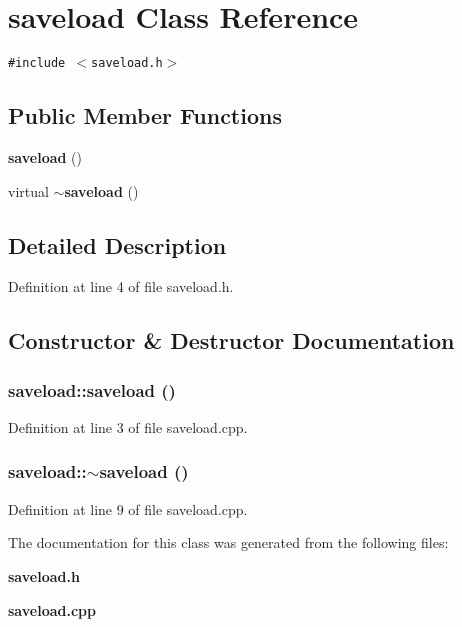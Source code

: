 \section{saveload Class Reference}
\label{classsaveload}
{\tt \#include $<$saveload.h$>$}

\subsection*{Public Member Functions}
\begin{CompactItemize}
\item 
{\bf saveload} ()
\item 
virtual {\bf $\sim$saveload} ()
\end{CompactItemize}


\subsection{Detailed Description}




Definition at line 4 of file saveload.h.

\subsection{Constructor \& Destructor Documentation}
\subsubsection{\setlength{\rightskip}{0pt plus 5cm}saveload::saveload ()}\label{classsaveload_84c555b790a657f7f377dbc59b3b69d0}




Definition at line 3 of file saveload.cpp.
\subsubsection{\setlength{\rightskip}{0pt plus 5cm}saveload::$\sim$saveload ()\hspace{0.3cm}{\tt  [virtual]}}\label{classsaveload_df3a3e98036b58d0fee93371545b7289}




Definition at line 9 of file saveload.cpp.

The documentation for this class was generated from the following files:\begin{CompactItemize}
\item 
{\bf saveload.h}\item 
{\bf saveload.cpp}\end{CompactItemize}
